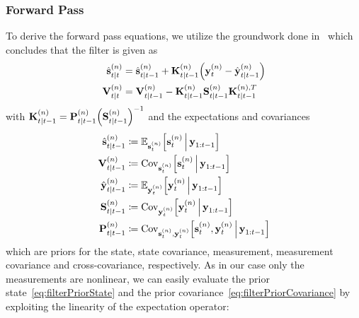 	\subsubsection{Forward Pass}
		To derive the forward pass equations, we utilize the groundwork done in~\cite{deisenrothProbabilisticPerspectiveGaussian2011} which concludes that the filter is given as
		\begin{align*}
			\hat{\boldsymbol{\mathrm{s}}}_{t \vert t}^{(n)} &= \hat{\boldsymbol{\mathrm{s}}}_{t \vert t - 1}^{(n)} + \boldsymbol{\mathrm{K}}_{t \vert t - 1}^{(n)} \Big(\boldsymbol{\mathrm{y}}_t^{(n)} - \hat{\boldsymbol{\mathrm{y}}}_{t \vert t - 1}^{(n)}\Big) \\
			\boldsymbol{\mathrm{V}}_{t \vert t}^{(n)}       &= \boldsymbol{\mathrm{V}}_{t \vert t - 1}^{(n)} - \boldsymbol{\mathrm{K}}_{t \vert t - 1}^{(n)} \boldsymbol{\mathrm{S}}_{t \vert t - 1}^{(n)} \boldsymbol{\mathrm{K}}_{t \vert t - 1}^{(n), T}
		\end{align*}
		with \( \boldsymbol{\mathrm{K}}_{t \vert t - 1}^{(n)} = \boldsymbol{\mathrm{P}}_{t \vert t - 1}^{(n)} \Big(\boldsymbol{\mathrm{S}}_{t \vert t - 1}^{(n)}\Big)^{-1} \) and the expectations and covariances
		\begin{align}
			\hat{\boldsymbol{\mathrm{s}}}_{t \vert t - 1}^{(n)} &\coloneqq \mathbb{E}_{\boldsymbol{\mathrm{s}}_t^{(n)}}\Big[\boldsymbol{\mathrm{s}}_t^{(n)} \,\Big\vert\, \boldsymbol{\mathrm{y}}_{1:t - 1}\Big]  \label{eq:filterPriorState} \\
			\boldsymbol{\mathrm{V}}_{t \vert t - 1}^{(n)}       &\coloneqq \operatorname{Cov}_{\boldsymbol{\mathrm{s}}_t^{(n)}}\!\Big[\boldsymbol{\mathrm{s}}_t^{(n)} \,\Big\vert\, \boldsymbol{\mathrm{y}}_{1:t - 1}\Big]  \label{eq:filterPriorCovariance} \\
			\hat{\boldsymbol{\mathrm{y}}}_{t \vert t - 1}^{(n)} &\coloneqq \mathbb{E}_{\boldsymbol{\mathrm{y}}_t^{(n)}}\Big[\boldsymbol{\mathrm{y}}_t^{(n)} \,\Big\vert\, \boldsymbol{\mathrm{y}}_{1:t - 1}\Big]  \label{eq:filterPriorMeas} \\
			\boldsymbol{\mathrm{S}}_{t \vert t - 1}^{(n)}       &\coloneqq \operatorname{Cov}_{\boldsymbol{\mathrm{y}}_t^{(n)}}\!\Big[\boldsymbol{\mathrm{y}}_t^{(n)} \,\Big\vert\, \boldsymbol{\mathrm{y}}_{1:t - 1}\Big]  \label{eq:filterPriorMeasCov} \\
			\boldsymbol{\mathrm{P}}_{t \vert t - 1}^{(n)}       &\coloneqq \operatorname{Cov}_{\boldsymbol{\mathrm{s}}_t^{(n)}, \boldsymbol{\mathrm{y}}_t^{(n)}}\!\Big[\boldsymbol{\mathrm{s}}_t^{(n)}, \boldsymbol{\mathrm{y}}_t^{(n)} \,\Big\vert\, \boldsymbol{\mathrm{y}}_{1:t - 1}\Big]  \label{eq:filterPriorKalman}
		\end{align}
		which are priors for the state, state covariance, measurement, measurement covariance and cross-covariance, respectively. As in our case only the measurements are nonlinear, we can easily evaluate the prior state~\eqref{eq:filterPriorState} and the prior covariance~\eqref{eq:filterPriorCovariance} by exploiting the linearity of the expectation operator:
